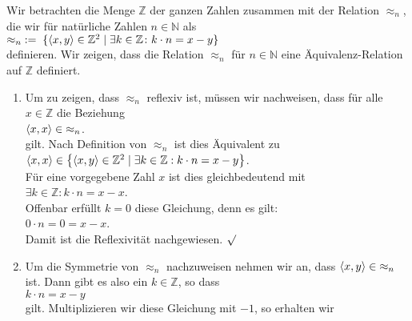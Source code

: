 \example
Wir betrachten die Menge $\mathbb{Z}$ der ganzen Zahlen
zusammen mit der Relation $\approx_n$, die wir f\"{u}r nat\"{u}rliche Zahlen $n\in\mathbb{N}$ 
als \\[0.2cm]
\hspace*{1.3cm}
 $\approx_n \;:=\; \{ \pair(x,y) \in \mathbb{Z}^2 \mid \exists k \in \mathbb{Z} \colon k \cdot n = x - y \}$
\\[0.2cm]
definieren.  Wir zeigen, dass die Relation $\approx_n$ f\"{u}r $n \in \mathbb{N}$ eine \"{A}quivalenz-Relation auf
$\mathbb{Z}$ definiert. 
\pagebreak
\begin{enumerate}
\item Um zu zeigen, dass $\approx_n$ reflexiv ist, m\"{u}ssen wir nachweisen, dass f\"{u}r alle
      $x \in \mathbb{Z}$ die Beziehung
      \\[0.2cm]
      \hspace*{1.3cm}
      $\pair(x,x) \in\; \approx_n$.        
      \\[0.2cm]
      gilt.  Nach Definition von $\approx_n$
      ist dies \"{A}quivalent zu \\[0.2cm]
      \hspace*{1.3cm}
      $\pair(x,x) \in \bigl\{ \pair(x,y) \in \mathbb{Z}^2 \mid \exists k \in \mathbb{Z}: k \cdot n = x - y \bigr\}$.
      \\[0.2cm]
      F\"{u}r eine vorgegebene Zahl $x$ ist dies gleichbedeutend mit \\[0.2cm]
      \hspace*{1.3cm}
      $\exists k \in \mathbb{Z}: k \cdot n = x - x$.
      \\[0.2cm]
      Offenbar erf\"{u}llt $k=0$ diese Gleichung, denn es gilt: \\[0.2cm]
      \hspace*{1.3cm}
      $0\cdot n = 0 = x - x$. 
      \\[0.2cm]
      Damit ist die Reflexivit\"{a}t nachgewiesen. $\surd$
\item Um die Symmetrie von $\approx_n$ nachzuweisen nehmen wir an, dass 
      $\pair(x,y) \in\; \approx_n$ ist.  Dann gibt es also ein $k \in \mathbb{Z}$, so dass
      \\[0.2cm]
      \hspace*{1.3cm}      
      $k\cdot n = x - y$
      \\[0.2cm] 
      gilt.  Multiplizieren wir diese Gleichung mit $-1$, so erhalten wir
      \\[0.2cm]
      \hspace*{1.3cm}      

\end{enumerate}
